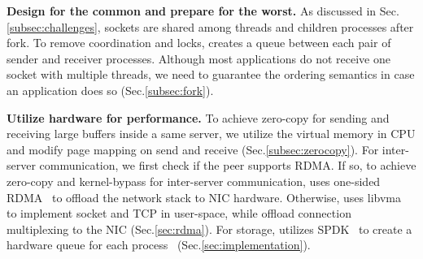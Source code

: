 \textbf{Design for the common and prepare for the worst.}
As discussed in Sec.\ref{subsec:challenges}, sockets are shared among threads and children processes after fork. To remove coordination and locks, \libipc creates a queue between each pair of sender and receiver processes. Although most applications do not receive one socket with multiple threads, we need to guarantee the ordering semantics in case an application does so (Sec.\ref{subsec:fork}).

\textbf{Utilize hardware for performance.}
To achieve zero-copy for sending and receiving large buffers inside a same server, we utilize the virtual memory in CPU and modify page mapping on send and receive (Sec.\ref{subsec:zerocopy}). For inter-server communication, we first check if the peer supports RDMA. If so, to achieve zero-copy and kernel-bypass for inter-server communication, \libipc uses one-sided RDMA~\cite{mitchell2013using} to offload the network stack to NIC hardware. Otherwise, \libipc uses libvma~\cite{libvma} to implement socket and TCP in user-space, while offload connection multiplexing to the NIC (Sec.\ref{sec:rdma}). For storage, \libipc utilizes SPDK~\cite{spdk} to create a hardware queue for each process~\cite{spdk} (Sec.\ref{sec:implementation}).





